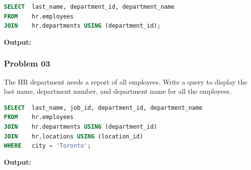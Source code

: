 \begin{frame}



\begin{lstlisting}[language=SQL]
SELECT 	last_name, department_id, department_name
FROM	hr.employees
JOIN	hr.departments USING (department_id);
\end{lstlisting}
\textbf{Output: }
\end{frame}


\vspace{6.5cm}
\subsubsection*{Problem 03}
The HR department needs a report of all employees. Write a query to display the last name, department number, and department name for all the employees.

\begin{frame}



\begin{lstlisting}[language=SQL]
SELECT 	last_name, job_id, department_id, department_name
FROM 	hr.employees
JOIN	hr.departments USING (department_id)
JOIN	hr.locations USING (location_id)
WHERE	city = 'Toronto';
\end{lstlisting}
\textbf{Output: }
\end{frame}

